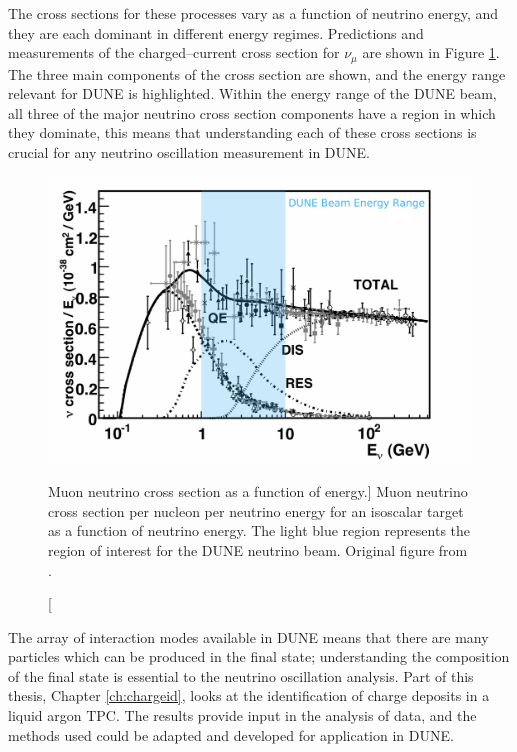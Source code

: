 \medskip\noindent
The cross sections for these processes vary as a function of neutrino energy,
and they are each dominant in different energy regimes. Predictions and 
measurements of the charged--current cross section for $\nu_\mu$ are shown in 
Figure \ref{fig:numu_xsec}. The three main components of the cross section are 
shown, and the energy range relevant for DUNE is 
highlighted\cite{Formaggio:2013kya}. Within the energy range of the DUNE beam,
all three of the major neutrino cross section components have a region in 
which they dominate, this means that understanding each of these cross 
sections is crucial for any neutrino oscillation measurement in DUNE. 

\begin{figure}
	\centering
	\includegraphics[width=\textwidth]{figures/numu_xsec.pdf}
	\caption
	[Muon neutrino cross section as a function of energy.]
	{Muon neutrino cross section per nucleon per neutrino energy for an isoscalar 
	target as a function of neutrino energy. The light blue region represents the 
	region of interest for the DUNE neutrino beam. Original figure from 
	\cite{Formaggio:2013kya}.}
	\label{fig:numu_xsec}
\end{figure}

The array of interaction modes available in DUNE means that there are many
particles which can be produced in the final state; understanding 
the composition of the final state is essential to the neutrino oscillation 
analysis. Part of this thesis, Chapter \ref{ch:chargeid}, looks at
the identification of charge deposits in a liquid argon TPC. The results 
provide input in the analysis of \protodune{} data, and the methods used could 
be adapted and developed for application in DUNE. 

